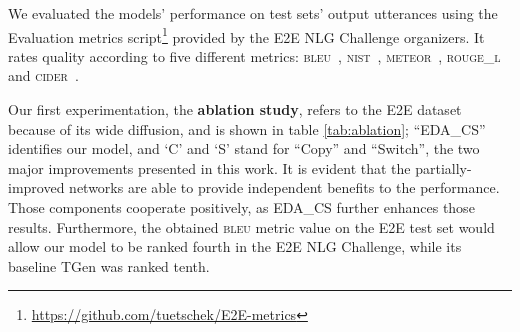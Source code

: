 \documentclass[runningheads, envcountsame, a4paper]{llncs}
\begin{document}
We evaluated the models' performance on test sets' output utterances using the Evaluation metrics script\footnote{\url{https://github.com/tuetschek/E2E-metrics}} provided by the E2E NLG Challenge organizers. It rates quality according to five different metrics: \textsc{bleu}~\cite{Papineni:02}, \textsc{nist}~\cite{Doddington:02}, \textsc{meteor}~\cite{Lavie:07}, \textsc{rouge\_l}~\cite{Lin:04} and \textsc{cider}~\cite{Vedantam:15}.

Our first experimentation, the \textbf{ablation study}, refers to the E2E dataset because of its wide diffusion, and is shown in table \ref{tab:ablation}; ``EDA\_CS'' identifies our model, and `C' and `S' stand for ``Copy'' and ``Switch'', the two major improvements presented in this work. It is evident that the partially-improved networks are able to provide independent benefits to the performance. Those components cooperate positively, as EDA\_CS further enhances those results. Furthermore, the obtained \textsc{bleu} metric value on the E2E test set would allow our model to be ranked fourth in the E2E NLG Challenge, while its baseline TGen was ranked tenth. 
\end{document}
